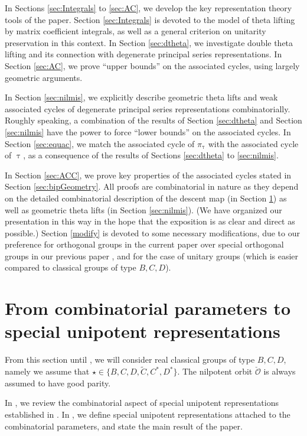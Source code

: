 \documentclass[11pt,a4paper]{amsart}
\newcommand{\CO}{{\mathcal {O}}}
\numberwithin{equation}{section}
\theoremstyle{remark}
\begin{document}
In Sections \ref{sec:Integrals} to \ref{sec:AC}, we develop the key representation theory tools of the paper. Section \ref{sec:Integrals} is devoted to the model of theta lifting by matrix coefficient integrals, as well as a general criterion on unitarity preservation in this context. In Section \ref{sec:dtheta}, we investigate double theta lifting and its connection with degenerate principal series representations. In  Section \ref{sec:AC}, we prove ``upper bounds'' on the associated cycles, using largely geometric arguments.

In Section \ref{sec:nilmis}, we explicitly describe geometric theta lifts and weak associated cycles of degenerate principal series representations combinatorially. Roughly speaking, a combination of the results of Section \ref{sec:dtheta} and Section \ref{sec:nilmis} have the power to force ``lower bounds'' on the associated cycles. In Section \ref{sec:equac}, we match the associated cycle of $\pi_{\uptau}$ with the associated cycle of $\uptau$, as a consequence of the results of Sections \ref{sec:dtheta} to  \ref{sec:nilmis}.

In Section \ref{sec:ACC}, we prove key properties of the associated cycles stated in
Section \ref{sec:bipGeometry}. All proofs are combinatorial in nature as they depend on the detailed combinatorial description of the descent map (in Section
\ref{sec:bip}) as well as geometric theta lifts (in
Section \ref{sec:nilmis}).  (We have organized our presentation in this way in the hope that the exposition is as clear and direct as possible.) Section \ref{modify} is devoted to some necessary modifications, due to our preference for orthogonal groups in the current paper over special orthogonal groups in our previous paper \cite{BMSZa}, and for the case of unitary groups (which is easier compared to  classical groups of type $B,C,D$).


\section{From combinatorial parameters to special unipotent representations}\label{sec:bip}

From this section until , we will consider real classical groups of type $B,C,D$, namely we  assume that $\star\in \{B,C,D,\widetilde {C}, C^*, D^*\}$. The nilpotent orbit $\check \CO$ is always assumed to have good parity.

In , we review the combinatorial aspect of special unipotent representations established in \cite{BMSZa}.
In , we define special unipotent representations attached to the combinatorial parameters, and state the main result of the paper.
\end{document}

